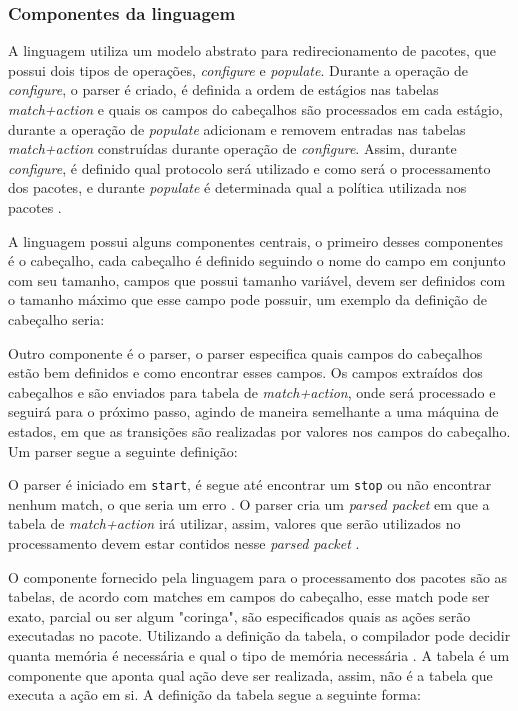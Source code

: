 \documentclass[
    12pt,
    openright, 
    oneside,
    a4paper,
    french,
    english,
    brazil
    ]{facom-ufu-abntex2}
\theoremstyle{definition}
\begin{document}
\subsubsection{Componentes da linguagem}

A linguagem utiliza um modelo abstrato para redirecionamento de pacotes, que possui
dois tipos de operações, \emph{configure} e \emph{populate}. Durante a operação
de \emph{configure}, o parser é criado, é definida a ordem de estágios nas tabelas
\emph{match+action} e quais os campos do cabeçalhos são processados em cada estágio,
durante a operação de \emph{populate} adicionam e removem entradas nas tabelas
\emph{match+action} construídas durante operação de \emph{configure}. Assim,
durante \emph{configure}, é definido qual protocolo será utilizado e como será
o processamento dos pacotes, e durante \emph{populate} é determinada qual a 
política utilizada nos pacotes \cite{bosshart2014p4}.

A linguagem possui alguns componentes centrais, o primeiro desses componentes 
é o cabeçalho, cada cabeçalho é definido seguindo o nome do campo em conjunto 
com seu tamanho, campos que possui tamanho variável, devem ser definidos com o
tamanho máximo que esse campo pode possuir, um exemplo da definição de cabeçalho
seria:



Outro componente é o parser, o parser especifica quais campos do cabeçalhos estão
bem definidos e como encontrar esses campos. Os campos extraídos dos cabeçalhos e 
são enviados para tabela de \emph{match+action}, onde será processado e seguirá
para o próximo passo, agindo de maneira semelhante a uma máquina de estados, em 
que as transições são realizadas por valores nos campos do cabeçalho. Um parser
segue a seguinte definição:



O parser é iniciado em \texttt{start}, é segue até encontrar um \texttt{stop} ou não
encontrar nenhum match, o que seria um erro \cite{bosshart2014p4}. O parser cria um 
\emph{parsed packet} em que a tabela de \emph{match+action} irá utilizar,
assim, valores que serão utilizados no processamento devem estar contidos nesse
\emph{parsed packet} \cite{p4USITutorial}.

O componente fornecido pela linguagem para o processamento dos pacotes são as tabelas,
de acordo com matches em campos do cabeçalho, esse match  pode ser exato, parcial 
ou ser algum "coringa", são especificados quais as ações serão executadas no
pacote. Utilizando a definição da tabela, o compilador pode decidir quanta memória 
é necessária e qual o tipo de memória necessária \cite{bosshart2014p4}. A
tabela é um componente que aponta qual ação deve ser realizada, assim, não é a 
tabela que executa a ação em si. A definição da tabela segue a seguinte forma:
\end{document}
